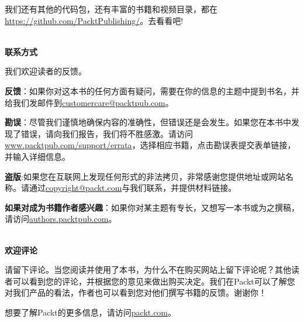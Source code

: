 我们还有其他的代码包，还有丰富的书籍和视频目录，都在\url{https://github.com/PacktPublishing/}。去看看吧!

\hspace*{\fill} \\ %
\textbf{联系方式}

我们欢迎读者的反馈。

\textbf{反馈}：如果你对这本书的任何方面有疑问，需要在你的信息的主题中提到书名，并给我们发邮件到\url{customercare@packtpub.com}。

\textbf{勘误}：尽管我们谨慎地确保内容的准确性，但错误还是会发生。如果您在本书中发现了错误，请向我们报告，我们将不胜感激。请访问\url{www.packtpub.com/support/errata}，选择相应书籍，点击勘误表提交表单链接，并输入详细信息。

\textbf{盗版}:如果您在互联网上发现任何形式的非法拷贝，非常感谢您提供地址或网站名称。请通过\url{copyright@packt.com}与我们联系，并提供材料链接。

\textbf{如果对成为书籍作者感兴趣}：如果你对某主题有专长，又想写一本书或为之撰稿，请访问\url{authors.packtpub.com}。

\hspace*{\fill} \\ %
\textbf{欢迎评论}

请留下评论。当您阅读并使用了本书，为什么不在购买网站上留下评论呢？其他读者可以看到您的评论，并根据您的意见来做出购买决定。我们在Packt可以了解您对我们产品的看法，作者也可以看到您对他们撰写书籍的反馈。谢谢你！

想要了解Packt的更多信息，请访问\url{packt.com}。










